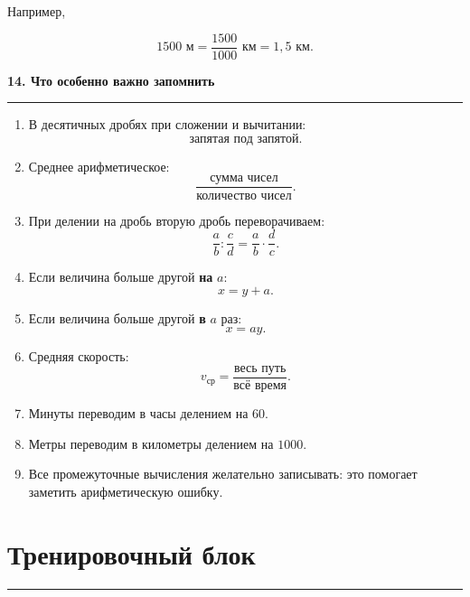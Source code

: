 \documentclass[a4paper,12pt]{article}
\newcommand{\topic}[1]{%
  \vspace{0.7em}
  {\Large\bfseries\color{darkaccent}#1}\par
  \vspace{0.25em}
  {\color{accent}\rule{\linewidth}{0.5pt}}
  \vspace{0.55em}
}
\begin{document}
Например,

\[
1500\text{ м}
=
\frac{1500}{1000}\text{ км}
=
1{,}5\text{ км}.
\]

\topic{14. Что особенно важно запомнить}

\begin{enumerate}
  \item В десятичных дробях при сложении и вычитании:
  \[
  \text{запятая под запятой}.
  \]

  \item Среднее арифметическое:
  \[
  \frac{\text{сумма чисел}}{\text{количество чисел}}.
  \]

  \item При делении на дробь вторую дробь переворачиваем:
  \[
  \frac ab:\frac cd
  =
  \frac ab\cdot\frac dc.
  \]

  \item Если величина больше другой \textbf{на} $a$:
  \[
  x=y+a.
  \]

  \item Если величина больше другой \textbf{в} $a$ раз:
  \[
  x=ay.
  \]

  \item Средняя скорость:
  \[
  v_{\text{ср}}
  =
  \frac{\text{весь путь}}{\text{всё время}}.
  \]

  \item Минуты переводим в часы делением на $60$.

  \item Метры переводим в километры делением на $1000$.

  \item Все промежуточные вычисления желательно записывать:
  это помогает заметить арифметическую ошибку.
\end{enumerate}


\clearpage

\section*{\textcolor{darkaccent}{Тренировочный блок}}

{\color{accent}\rule{\linewidth}{0.6pt}}

\vspace{0.5em}
\end{document}
